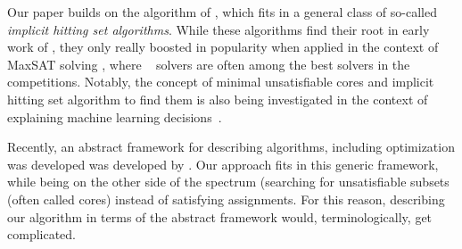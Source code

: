 Our paper builds on the algorithm of \citet{ignatiev2015smallest}, which fits in a general class of so-called \emph{implicit hitting set algorithms}.
While these algorithms find their root in early work of \citet{ai/Reiter87}, they only really boosted in popularity when applied in the context of MaxSAT solving \cite{DBLP:conf/cp/DaviesB11,DBLP:conf/sat/DaviesB13,davies}, where \hitsetbased~ solvers are often among the best solvers in the competitions. 
Notably, the concept of minimal unsatisfiable cores and implicit hitting set algorithm to find them is also being investigated in the context of explaining machine learning decisions~\cite{ignatiev2019abduction}.


Recently, an abstract framework for describing \hitsetbased algorithms, including optimization was developed was developed by \citet{DBLP:conf/kr/SaikkoWJ16}. Our approach fits in this generic framework, while being on the other side of the spectrum (searching for unsatisfiable subsets (often called cores) instead of satisfying assignments. For this reason, describing our algorithm in terms of the abstract framework would, terminologically, get complicated. 


